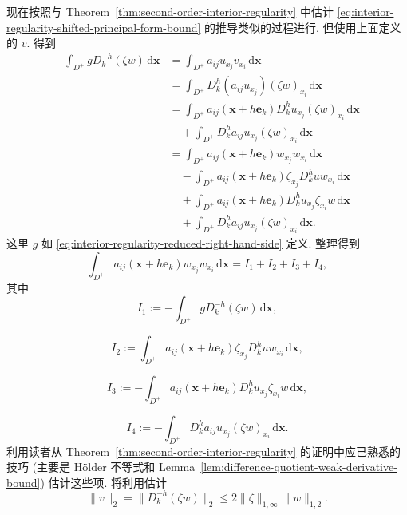 \begin{Proof}
现在按照与 Theorem~\ref{thm:second-order-interior-regularity} 中估计 \eqref{eq:interior-regularity-shifted-principal-form-bound} 的推导类似的过程进行, 但使用上面定义的 $v$. 得到\[\begin{aligned}
-\int_{D^+}gD_k^{-h}(\zeta w)\,\mathrm{d}\bm{x}
&=\int_{D^+}a_{ij}u_{x_j}v_{x_i}\,\mathrm{d}\bm{x}\\
&=\int_{D^+}D_k^h(a_{ij}u_{x_j})(\zeta w)_{x_i}\,\mathrm{d}\bm{x}\\
&=\int_{D^+}a_{ij}(\bm{x}+h\bm{e}_k)D_k^hu_{x_j}(\zeta w)_{x_i}\,\mathrm{d}\bm{x}\\
&\quad+\int_{D^+}D_k^ha_{ij}u_{x_j}(\zeta w)_{x_i}\,\mathrm{d}\bm{x}\\
&=\int_{D^+}a_{ij}(\bm{x}+h\bm{e}_k)w_{x_j}w_{x_i}\,\mathrm{d}\bm{x}\\
&\quad-\int_{D^+}a_{ij}(\bm{x}+h\bm{e}_k)\zeta_{x_j}D_k^huw_{x_i}\,\mathrm{d}\bm{x}\\
&\quad+\int_{D^+}a_{ij}(\bm{x}+h\bm{e}_k)D_k^hu_{x_j}\zeta_{x_i}w\,\mathrm{d}\bm{x}\\
&\quad+\int_{D^+}D_k^ha_{ij}u_{x_j}(\zeta w)_{x_i}\,\mathrm{d}\bm{x}.
\end{aligned}\]这里 $g$ 如 \eqref{eq:interior-regularity-reduced-right-hand-side} 定义. 整理得到
\begin{equation}\label{eq:flat-boundary-principal-energy-four-term-decomposition}
\int_{D^+}a_{ij}(\bm{x}+h\bm{e}_k)w_{x_j}w_{x_i}\,\mathrm{d}\bm{x}=I_1+I_2+I_3+I_4,
\end{equation}
其中
\begin{equation}\label{eq:flat-boundary-energy-term-one}
I_1:=-\int_{D^+}gD_k^{-h}(\zeta w)\,\mathrm{d}\bm{x},
\end{equation}

\begin{equation}\label{eq:flat-boundary-energy-term-two}
I_2:=\int_{D^+}a_{ij}(\bm{x}+h\bm{e}_k)\zeta_{x_j}D_k^huw_{x_i}\,\mathrm{d}\bm{x},
\end{equation}

\begin{equation}\label{eq:flat-boundary-energy-term-three}
I_3:=-\int_{D^+}a_{ij}(\bm{x}+h\bm{e}_k)D_k^hu_{x_j}\zeta_{x_i}w\,\mathrm{d}\bm{x},
\end{equation}

\begin{equation}\label{eq:flat-boundary-energy-term-four}
I_4:=-\int_{D^+}D_k^ha_{ij}u_{x_j}(\zeta w)_{x_i}\,\mathrm{d}\bm{x}.
\end{equation}
利用读者从 Theorem~\ref{thm:second-order-interior-regularity} 的证明中应已熟悉的技巧 (主要是 Hölder 不等式和 Lemma~\ref{lem:difference-quotient-weak-derivative-bound}) 估计这些项. 将利用估计
\begin{equation}\label{eq:flat-boundary-test-function-l2-bound}
\|v\|_2=\|D_k^{-h}(\zeta w)\|_2\leq2\|\zeta\|_{1,\infty}\|w\|_{1,2}.
\end{equation}

\end{Proof}
\endgroup
